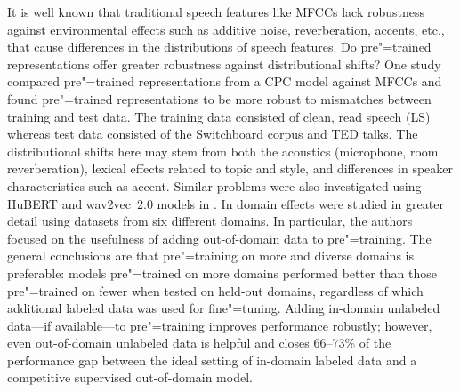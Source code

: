 It is well known that traditional speech features like MFCCs lack
robustness against environmental effects such as additive noise,
reverberation, accents, etc., that cause differences in the distributions of
speech features.
Do pre"=trained representations offer greater robustness against distributional
shifts? 
One study~\parencite{kawakami_learning_2020} compared pre"=trained
representations from a CPC model against MFCCs and 
found pre"=trained representations to be more robust to mismatches between
training and test data. The 
training data consisted of clean, read speech (LS)
whereas test data consisted of the Switchboard corpus and TED talks. The
distributional shifts here may stem from both the acoustics (microphone, room
reverberation),
lexical effects related to topic and style, and differences in speaker
characteristics such as accent. 
Similar problems were also investigated using HuBERT and wav2vec~2.0 models in
\parencite{chang_exploration_2021}.
In \parencite{hsu_robust_2021} domain effects were studied in greater detail using 
datasets from six different domains. In particular, the authors focused on the
usefulness of adding out-of-domain data to pre"=training. The general
conclusions are that pre"=training on more and diverse domains is preferable:
models pre"=trained on more domains performed better than those pre"=trained on
fewer when tested on held-out domains, regardless of which additional
labeled data was used for fine"=tuning. Adding in-domain unlabeled data---if
available---to pre"=training improves performance robustly; however, even
out-of-domain unlabeled data is helpful and closes  66--73\% of the performance
gap between the ideal setting of in-domain labeled data and a competitive
supervised out-of-domain model. 
 
